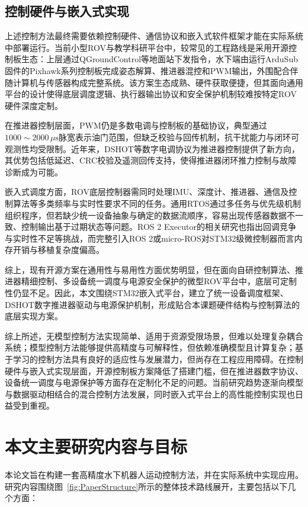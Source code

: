 \subsection{控制硬件与嵌入式实现}

上述控制方法最终需要依赖控制硬件、通信协议和嵌入式软件框架才能在实际系统中部署运行。当前小型ROV与教学科研平台中，较常见的工程路线是采用开源控制板生态：上层通过QGroundControl等地面站下发指令，水下端由运行ArduSub固件的Pixhawk系列控制板完成姿态解算、推进器混控和PWM输出，外围配合伴随计算机与传感器构成完整系统\cite{ardusub_autopilot_docs}。该方案生态成熟、硬件获取便捷，但其面向通用平台的设计使得底层调度逻辑、执行器输出协议和安全保护机制较难按特定ROV硬件深度定制。

在推进器控制层面，PWM仍是多数电调与控制板的基础协议，典型通过$1000\sim2000\,\mu\text{s}$脉宽表示油门范围，但缺乏校验与回传机制，抗干扰能力与闭环可观测性均受限制\cite{ardupilot_pwm_esc_docs,blueos_esc_docs}。近年来，DSHOT等数字电调协议为推进器控制提供了新方向，其优势包括低延迟、CRC校验及遥测回传支持\cite{px4_dshot_docs}，使得推进器闭环推力控制与故障诊断成为可能。

嵌入式调度方面，ROV底层控制器需同时处理IMU、深度计、推进器、通信及控制算法等多类频率与实时性要求不同的任务。通用RTOS通过多任务与优先级机制组织程序\cite{freertos_scheduler_docs}，但若缺少统一设备抽象与确定的数据流顺序，容易出现传感器数据不一致、控制输出基于过期状态等问题。ROS 2 Executor的相关研究也指出回调竞争与实时性不足等挑战\cite{xu2022ros2_realtime_executor,chaaban2023ros2_scheduling,wang2024microros_pods}，而完整引入ROS 2或micro-ROS对STM32级微控制器而言内存开销与移植复杂度偏高。

综上，现有开源方案在通用性与易用性方面优势明显，但在面向自研控制算法、推进器精细控制、多设备统一调度与电源安全保护的微型ROV平台中，底层可定制性仍显不足。因此，本文围绕STM32嵌入式平台，建立了统一设备调度框架、DSHOT数字推进器驱动与电源保护机制，形成贴合本课题硬件结构与控制算法的底层实现方案。

综上所述，无模型控制方法实现简单、适用于资源受限场景，但难以处理复杂耦合系统；模型控制方法能够提供高精度与可解释性，但依赖准确模型且计算复杂；基于学习的控制方法具有良好的适应性与发展潜力，但尚存在工程应用障碍。在控制硬件与嵌入式实现层面，开源控制板方案降低了搭建门槛，但在推进器数字协议、设备统一调度与电源保护等方面存在定制化不足的问题。当前研究趋势逐渐向模型与数据驱动相结合的混合控制方法发展，同时嵌入式平台上的高性能控制实现也日益受到重视。

\section{本文主要研究内容与目标}
本论文旨在构建一套高精度水下机器人运动控制方法，并在实际系统中实现应用。研究内容围绕图~\ref{fig:PaperStructure}所示的整体技术路线展开，主要包括以下几个方面：

